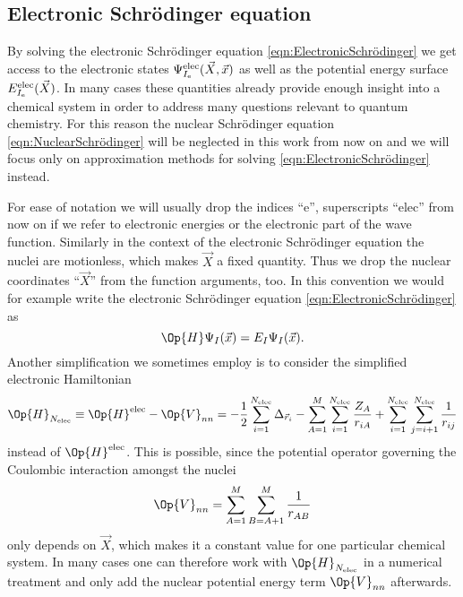 \subsection{Electronic Schrödinger equation}
\label{sec:ElectronicSchrödinger}
By solving the electronic Schrödinger equation \eqref{eqn:ElectronicSchrödinger}
we get access to the electronic states $\Psi^\text{elec}_{I_\text{e}}(\vec{X}, \vec{x})$
as well as the potential energy surface $E^\text{elec}_{I_\text{e}}(\vec{X})$.
In many cases these quantities already provide
enough insight into a chemical system in order to address many
questions relevant to quantum chemistry.
For this reason the nuclear Schrödinger equation \eqref{eqn:NuclearSchrödinger}
will be neglected in this work from now on
and we will focus only
on approximation methods for solving \eqref{eqn:ElectronicSchrödinger} instead.

For ease of notation we will usually drop the indices ``e'',
superscripts ``elec'' from now on if we refer to electronic energies
or the electronic part of the wave function.
Similarly in the context of the electronic Schrödinger equation
the nuclei are motionless, which makes $\vec{X}$ a fixed quantity.
Thus we drop the nuclear coordinates ``$\vec{X}$''
from the function arguments, too.
In this convention we would for example
write the electronic Schrödinger equation \eqref{eqn:ElectronicSchrödinger} as
\[ \Op{H} \Psi_I(\vec{x}) = E_I \Psi_I(\vec{x}). \]
Another simplification we sometimes employ is to consider
the simplified electronic Hamiltonian
\begin{equation}
	\Op{H}_{\Nelec} \equiv \Op{H}^\text{elec} - \Op{V}_{nn}
	= -\frac12 \sum_{i=1}^{\Nelec} \Delta_{\vec{r}_i}
	- \sum_{A=1}^M \sum_{i=1}^{\Nelec} \frac{Z_A}{r_{iA}}
	+ \sum_{i=1}^{\Nelec} \sum_{j=i+1}^{\Nelec} \frac{1}{r_{ij}}
	\label{eqn:ElectronicHamiltonian}
\end{equation}
instead of $\Op{H}^\text{elec}$.
This is possible, since the potential operator governing the Coulombic interaction
amongst the nuclei
\[
	\Op{V}_{nn} = \sum_{A=1}^M \sum_{B=A+1}^M \frac1{r_{AB}}
\]
only depends on $\vec{X}$, which makes it a constant value for one particular chemical system.
In many cases one can therefore work with $\Op{H}_{\Nelec}$
in a numerical treatment and only add the nuclear potential energy term $\Op{V}_{nn}$
afterwards.

